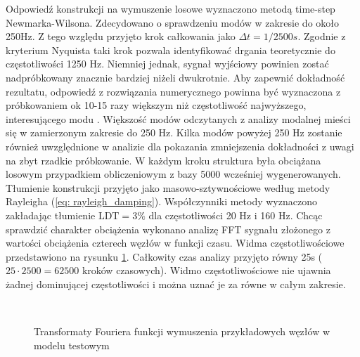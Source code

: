 Odpowiedź konstrukcji na wymuszenie losowe wyznaczono metodą time-step Newmarka-Wilsona. Zdecydowano o sprawdzeniu modów w zakresie do około 250Hz. Z tego względu przyjęto krok całkowania jako $\Delta t = 1/2500 s$. Zgodnie z kryterium Nyquista taki krok pozwala identyfikować drgania teoretycznie do częstotliwości 1250 Hz. Niemniej jednak, sygnał wyjściowy powinien zostać nadpróbkowany znacznie bardziej niżeli dwukrotnie. Aby zapewnić dokładność rezultatu, odpowiedź z rozwiązania numerycznego powinna być wyznaczona z próbkowaniem ok 10-15 razy większym niż częstotliwość najwyższego, interesującego modu \parencite{Kacprzyk1983,Rakowski2016,Bajer2012,Zotowski2017c}. Większość modów odczytanych z analizy modalnej mieści się w zamierzonym zakresie do 250 Hz. Kilka modów powyżej 250 Hz zostanie również uwzględnione w analizie dla pokazania zmniejszenia dokładności z uwagi na zbyt rzadkie próbkowanie. W każdym kroku struktura była obciążana losowym przypadkiem obliczeniowym z bazy 5000 wcześniej wygenerowanych. Tłumienie konstrukcji przyjęto jako masowo-sztywnościowe według metody Rayleigha (\ref{eq: rayleigh_damping}). Współczynniki metody wyznaczono zakładając tłumienie $\text{LDT}=3\%$ dla częstotliwości 20 Hz i 160 Hz. Chcąc sprawdzić charakter obciążenia wykonano analizę FFT sygnału złożonego z wartości obciążenia czterech węzłów w funkcji czasu. Widma częstotliwościowe przedstawiono na rysunku \ref{fig: fft_load_input_blue_beam}. Całkowity czas analizy przyjęto równy 25s ($25\cdot2500=62500$ kroków czasowych). Widmo częstotliwościowe nie ujawnia żadnej dominującej częstotliwości i można uznać je za równe w całym zakresie.
\begin{figure}[h]
	\centering
	\\
	\captionsetup{justification=centering}
	\caption{Transformaty Fouriera funkcji wymuszenia przykładowych węzłów w modelu testowym}
	\label{fig: fft_load_input_blue_beam}
\end{figure}

